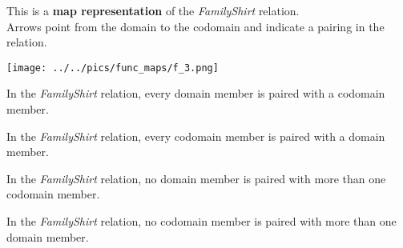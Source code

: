 \documentclass{ximera}
\author{Lee Wayand}
\begin{document}
\begin{exercise}

This is a \textbf{map representation} of the \textit{FamilyShirt} relation. \\


Arrows point from the domain to the codomain and indicate a pairing in the relation.


\begin{image}
\texttt{[image: ../../pics/func\_maps/f\_3.png]}
\end{image}




\begin{question} 
In the \textit{FamilyShirt} relation, every domain member is paired with a codomain member.

\begin{multipleChoice}
\end{multipleChoice}
\end{question}







\begin{question} 
In the \textit{FamilyShirt} relation, every codomain member is paired with a domain member.

\begin{multipleChoice}
\end{multipleChoice}
\end{question}







\begin{question} 
In the \textit{FamilyShirt} relation, no domain member is paired with more than one codomain member.

\begin{multipleChoice}
\end{multipleChoice}
\end{question}








\begin{question} 
In the \textit{FamilyShirt} relation, no codomain member is paired with more than one domain member.


\end{question}
\end{exercise}
\end{document}
